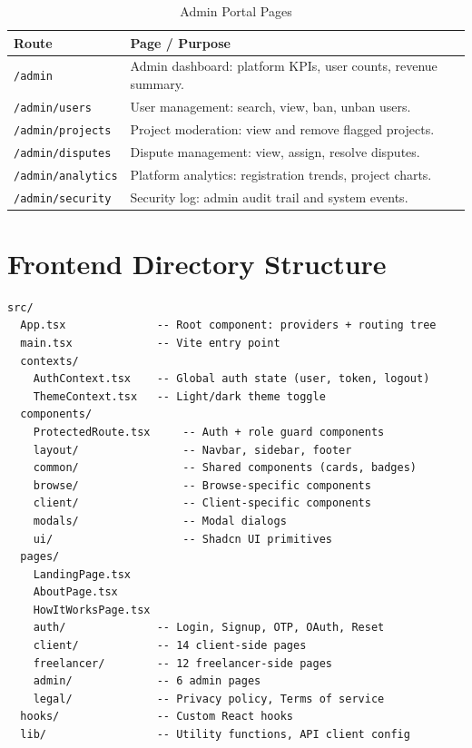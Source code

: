 \begin{table}[H]
\centering
\caption{Admin Portal Pages}
\begin{tabularx}{\textwidth}{lX}
\toprule
\textbf{Route} & \textbf{Page / Purpose} \\
\midrule
\texttt{/admin}            & Admin dashboard: platform KPIs, user counts, revenue summary. \\
\texttt{/admin/users}      & User management: search, view, ban, unban users. \\
\texttt{/admin/projects}   & Project moderation: view and remove flagged projects. \\
\texttt{/admin/disputes}   & Dispute management: view, assign, resolve disputes. \\
\texttt{/admin/analytics}  & Platform analytics: registration trends, project charts. \\
\texttt{/admin/security}   & Security log: admin audit trail and system events. \\
\bottomrule
\end{tabularx}
\end{table}

\section{Frontend Directory Structure}

\begin{lstlisting}[caption={Frontend Directory Structure (ASCII)}]
src/
  App.tsx              -- Root component: providers + routing tree
  main.tsx             -- Vite entry point
  contexts/
    AuthContext.tsx    -- Global auth state (user, token, logout)
    ThemeContext.tsx   -- Light/dark theme toggle
  components/
    ProtectedRoute.tsx     -- Auth + role guard components
    layout/                -- Navbar, sidebar, footer
    common/                -- Shared components (cards, badges)
    browse/                -- Browse-specific components
    client/                -- Client-specific components
    modals/                -- Modal dialogs
    ui/                    -- Shadcn UI primitives
  pages/
    LandingPage.tsx
    AboutPage.tsx
    HowItWorksPage.tsx
    auth/              -- Login, Signup, OTP, OAuth, Reset
    client/            -- 14 client-side pages
    freelancer/        -- 12 freelancer-side pages
    admin/             -- 6 admin pages
    legal/             -- Privacy policy, Terms of service
  hooks/               -- Custom React hooks
  lib/                 -- Utility functions, API client config
\end{lstlisting}

